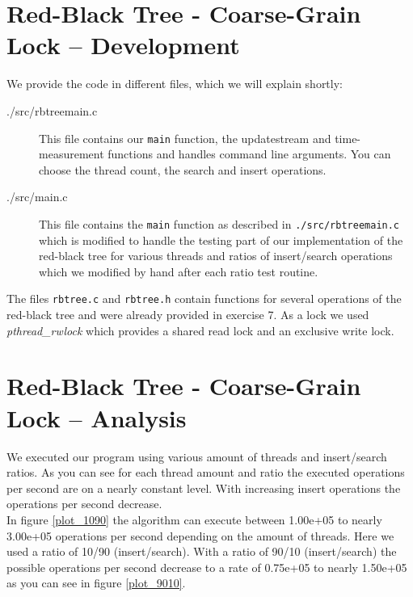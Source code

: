 \documentclass[oneside,a4paper]{scrartcl}
\begin{document}
\section*{Red-Black Tree - Coarse-Grain Lock -- Development}
\label{dev}
We provide the code in different files, which we will explain shortly:
\begin{description}
    \item[./src/rbtreemain.c] This file contains our \texttt{main} function, the updatestream and 
				time-measurement functions and handles command line arguments. 
				You can choose the thread count, the search and insert operations.
    \item[./src/main.c] This file contains the \texttt{main} function as described in 
			\texttt{./src/rbtreemain.c} which is modified to handle the testing part of 
			our implementation of the red-black tree for various threads and ratios of 
			insert/search operations which we modified by hand after each ratio test routine. 
\end{description}
The files \texttt{rbtree.c} and \texttt{rbtree.h} contain functions for several operations of the red-black
tree and were already provided in exercise 7.
As a lock we used \emph{pthread\_rwlock} which provides a shared read lock and an exclusive write lock.

\section*{Red-Black Tree - Coarse-Grain Lock -- Analysis}
We executed our program using various amount of threads and insert/search ratios. As you can see for each 
thread amount and ratio the executed operations per second are on a nearly constant level.  With increasing
insert operations the operations per second decrease. \\
 In figure \ref{plot_1090} the algorithm can execute between 1.00e+05 to nearly 3.00e+05 operations per second 
depending on the amount of threads. Here we used a ratio of 10/90 (insert/search). With a ratio of 90/10 (insert/search)
the possible operations per second decrease to a rate of 0.75e+05 to nearly 1.50e+05 as you can see in figure 
\ref{plot_9010}.
    
\end{document}
